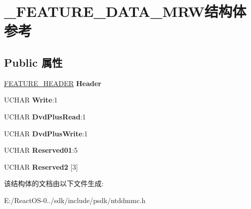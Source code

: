 \hypertarget{struct___f_e_a_t_u_r_e___d_a_t_a___m_r_w}{}\section{\+\_\+\+F\+E\+A\+T\+U\+R\+E\+\_\+\+D\+A\+T\+A\+\_\+\+M\+R\+W结构体 参考}
\label{struct___f_e_a_t_u_r_e___d_a_t_a___m_r_w}
\subsection*{Public 属性}
\begin{DoxyCompactItemize}
\item 
\mbox{\label{struct___f_e_a_t_u_r_e___d_a_t_a___m_r_w_a998cfac679b5471fb63a19816f90c08d}} 
\hyperlink{struct___f_e_a_t_u_r_e___h_e_a_d_e_r}{F\+E\+A\+T\+U\+R\+E\+\_\+\+H\+E\+A\+D\+ER} {\bfseries Header}
\item 
\mbox{\label{struct___f_e_a_t_u_r_e___d_a_t_a___m_r_w_ab30fa2ea98b45a28d63cdd962e4d0a7f}} 
U\+C\+H\+AR {\bfseries Write}\+:1
\item 
\mbox{\label{struct___f_e_a_t_u_r_e___d_a_t_a___m_r_w_a0ccd2a77cf5d65eca485bd76481df71f}} 
U\+C\+H\+AR {\bfseries Dvd\+Plus\+Read}\+:1
\item 
\mbox{\label{struct___f_e_a_t_u_r_e___d_a_t_a___m_r_w_aebc6095fbfb2b79b66b02a34ad6e26f2}} 
U\+C\+H\+AR {\bfseries Dvd\+Plus\+Write}\+:1
\item 
\mbox{\label{struct___f_e_a_t_u_r_e___d_a_t_a___m_r_w_a33539970297c8ba86055a42cf1c0fbff}} 
U\+C\+H\+AR {\bfseries Reserved01}\+:5
\item 
\mbox{\label{struct___f_e_a_t_u_r_e___d_a_t_a___m_r_w_a9db6a9caf1b6c61fc9db4643fe7d0b52}} 
U\+C\+H\+AR {\bfseries Reserved2} \mbox{[}3\mbox{]}
\end{DoxyCompactItemize}


该结构体的文档由以下文件生成\+:\begin{DoxyCompactItemize}
\item 
E\+:/\+React\+O\+S-\/0../sdk/include/psdk/ntddmmc.\+h\end{DoxyCompactItemize}
